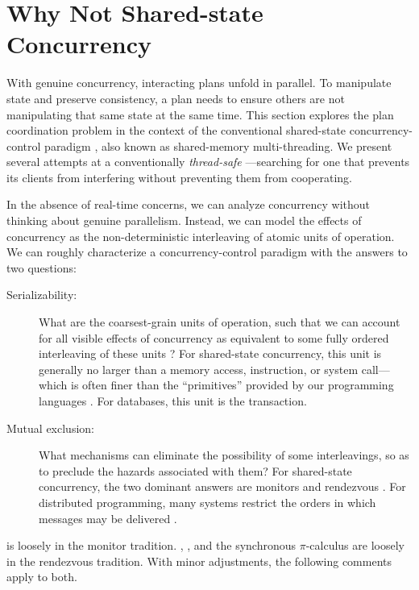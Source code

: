 \documentclass{llncs}
\begin{document}
\section{Why Not Shared-state Concurrency}

With genuine concurrency, interacting plans unfold in parallel. To
manipulate state and preserve consistency, a plan needs to ensure
others are not manipulating that same state at the same time. This
section explores the plan coordination problem in the context of the
conventional shared-state concurrency-control paradigm
\cite{VanRoyHaridi}, also known as shared-memory multi-threading. We
present several attempts at a conventionally \emph{thread-safe}
---searching for one that prevents its clients from
interfering without preventing them from cooperating.

In the absence of real-time concerns, we can analyze concurrency
without thinking about genuine parallelism. Instead, we can model the
effects of concurrency as the non-deterministic interleaving of atomic
units of operation. We can roughly characterize a
concurrency-control paradigm with the answers to two questions:
%
\begin{description}

\item[Serializability:] 

What are the coarsest-grain units of operation, such that we can
account for all visible effects of concurrency as equivalent to some
fully ordered interleaving of these units \cite{IBM:POO}? For
shared-state concurrency, this unit is generally no larger than a
memory access, instruction, or system call---which is often finer than
the ``primitives'' provided by our programming languages
\cite{boehm:threads}. For databases, this unit is the transaction.

\item[Mutual exclusion:]

What mechanisms can eliminate the possibility of some interleavings,
so as to preclude the hazards associated with them? For shared-state
concurrency, the two dominant answers are monitors
\cite{hoare:monitors,hansen:monitors} and rendezvous
\cite{hoare:csp}. For distributed programming, many systems restrict
the orders in which messages may be delivered
\cite{birman:vsync,amir:thesis,lamport:paxos}.

\end{description}
%
 is loosely in the monitor tradition. ,
, and the synchronous $\pi$-calculus are loosely in
the rendezvous tradition. With minor adjustments, the following
comments apply to both.
\end{document}
